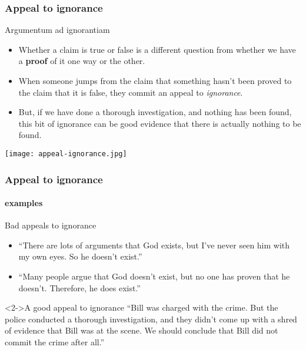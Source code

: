 \documentclass[10pt,letterpaper,xcolor=dvipsnames]{beamer}
\begin{document}
\begin{frame}
  \frametitle{Appeal to ignorance}
  
  \begin{block}{Argumentum ad ignorantiam}
    \begin{itemize}
      \item Whether a claim is true or false is a different question from whether we have a \textbf{proof} of it one way or the other.
      \item When someone jumps from the claim that something hasn't been proved to the claim that it is false, they commit an appeal to \textit{ignorance}.
      \item But, if we have done a thorough investigation, and nothing has been found, this bit of ignorance can be good evidence that there is actually nothing to be found.
    \end{itemize}
  \end{block}
  
  \begin{center}
    \texttt{[image: appeal-ignorance.jpg]}
  \end{center}
  
\end{frame}

\begin{frame}
  \frametitle{Appeal to ignorance}
  \framesubtitle{examples}
  
  \begin{block}{Bad appeals to ignorance}
    \begin{itemize}
      \item ``There are lots of arguments that God exists, but I've never seen him with my own eyes.  So he doesn't exist.''
      \item ``Many people argue that God doesn't exist, but no one has proven that he doesn't.  Therefore, he does exist.''
    \end{itemize}
  \end{block}
  
  \begin{block}<2->{A good appeal to ignorance}
    ``Bill was charged with the crime.  But the police conducted a thorough investigation, and they didn't come up with a shred of evidence that Bill was at the scene.  We should conclude that Bill did not commit the crime after all.''
  \end{block}
  
\end{frame}
\end{document}
